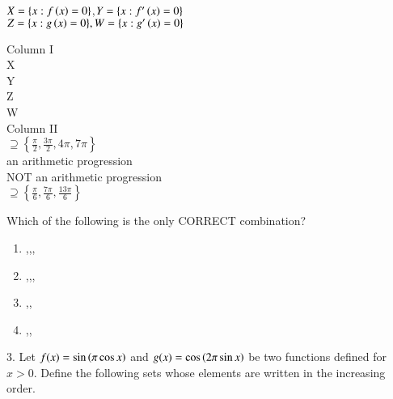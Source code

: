 \documentclass[journal,12pt,twocolumn]{IEEEtran}
\theoremstyle{remark}
\begin{document}
$X=\{x:f\left(x\right)=0\}$,$Y=\{x:f'\left(x\right)=0\}$\\
$Z=\{x:g\left(x\right)=0\}, W=\{x:g'\left(x\right)=0\}$
\\
\begin{multicols}{2}
Column I
\\
 X
\\
 Y
\\
 Z
\\
 W
\columnbreak
\\
Column II
\\
 $\supseteq \left\{ \frac{\pi}{2}, \frac{3\pi}{2}, 4\pi, 7\pi \right\}$
\\
an arithmetic progression
\\
NOT an arithmetic progression
\\
$\supseteq\left\{\frac{\pi}{6},\frac{7\pi}{6},\frac{13\pi}{6}\right\}$


\end{multicols}
Which of the following is the only CORRECT combination?
\\
\begin{enumerate}[label=\alph*]
\item{},,,
\item{},,,
\item{},,
\item{},,
\end{enumerate}


$3$. Let $f(x) = \sin\left(\pi \cos x\right)$ and $g(x) = \cos\left(2\pi \sin x\right)$ be two functions defined for $x > 0$. Define the following sets whose elements are written in the increasing order. \hfill{}
\end{document}
